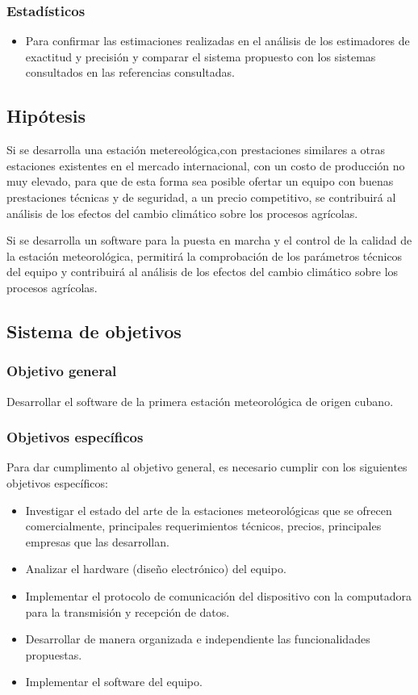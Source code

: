 \documentclass[conference, a4paper]{IEEEtran}
\begin{document}
\subsubsection{Estadísticos}
\begin{itemize}
	\item Para confirmar las estimaciones realizadas en el análisis de los estimadores de
	      exactitud y precisión y comparar el sistema propuesto con los sistemas
	      consultados en las referencias consultadas.
\end{itemize}

\subsection{Hipótesis}\label{subsec:hipotesis}
Si se desarrolla una estación metereológica,con prestaciones similares a otras
estaciones existentes en el mercado internacional, con un costo de producción
no muy elevado, para que de esta forma sea posible ofertar un equipo con buenas
prestaciones técnicas y de seguridad, a un precio competitivo, se contribuirá
al análisis de los efectos del cambio climático sobre los procesos agrícolas.

Si se desarrolla un software para la puesta en marcha y el control de la
calidad de la estación meteorológica, permitirá la comprobación de los
parámetros técnicos del equipo y contribuirá al análisis de los efectos del
cambio climático sobre los procesos agrícolas.

\subsection{Sistema de objetivos}\label{subsec:sistema-de-objetivos}

\subsubsection*{Objetivo general}
Desarrollar el software de la primera estación meteorológica de origen cubano.

\subsubsection*{Objetivos específicos}
Para dar cumplimento al objetivo general, es necesario cumplir con los siguientes objetivos específicos:
\begin{itemize}
	\item Investigar el estado del arte de la estaciones meteorológicas que se ofrecen
	      comercialmente, principales requerimientos técnicos, precios, principales
	      empresas que las desarrollan.
	\item Analizar el hardware (diseño electrónico) del equipo.
	\item Implementar el protocolo de comunicación del dispositivo con la computadora
	      para la transmisión y recepción de datos.
	\item Desarrollar de manera organizada e independiente las funcionalidades
	      propuestas.
	\item Implementar el software del equipo.
\end{itemize}
\end{document}
